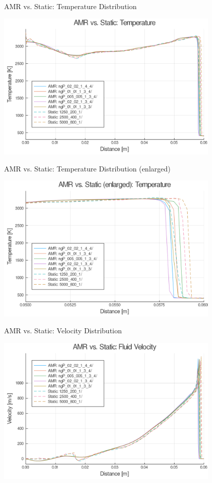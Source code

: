 \begin{frame}{AMR vs. Static: Temperature Distribution}
\begin{center}
\includegraphics[width=0.8\textwidth]{../figs/amrfigs/amrcompare/t.png}
\end{center}
\end{frame}

\begin{frame}{AMR vs. Static: Temperature Distribution (enlarged)}
\begin{center}
\includegraphics[width=0.8\textwidth]{../figs/amrfigs/amrcompare/te.png}
\end{center}
\end{frame}

\begin{frame}{AMR vs. Static: Velocity Distribution}
\begin{center}
\includegraphics[width=0.8\textwidth]{../figs/amrfigs/amrcompare/u.png}
\end{center}
\end{frame}

